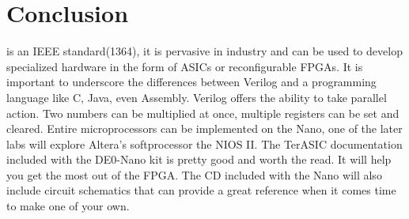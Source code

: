 \section{Conclusion}
   is an IEEE standard(1364)\cite{Wikipedia:Verilog}, it is pervasive in industry and can be used to develop specialized hardware in the form of ASICs or reconfigurable FPGAs. It is important to underscore the differences between Verilog and a programming language like C, Java, even Assembly. Verilog offers the ability to take parallel action. Two numbers can be multiplied at once, multiple registers can be set and cleared. Entire microprocessors can be implemented on the Nano, one of the later labs will explore Altera's softprocessor the NIOS II. The TerASIC documentation included with the DE0-Nano kit is pretty good and worth the read. It will help you get the most out of the FPGA. The CD included with the Nano will also include circuit schematics that can provide a great reference when it comes time to make one of your own.



